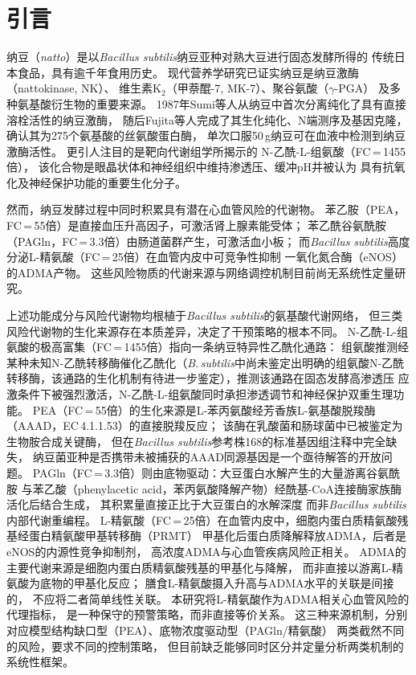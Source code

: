 \documentclass[10pt, a4paper, twocolumn]{ctexart}
\newcommand{\bs}{\textit{Bacillus subtilis}}
\newcommand{\NAH}{N-乙酰-L-组氨酸}
\begin{document}

\section{引言}

纳豆（\textit{natto}）是以\bs{}纳豆亚种对熟大豆进行固态发酵所得的
传统日本食品，具有逾千年食用历史。
现代营养学研究已证实纳豆是纳豆激酶（nattokinase, NK）、
维生素K$_2$（甲萘醌-7, MK-7）、聚谷氨酸（$\gamma$-PGA）
及多种氨基酸衍生物的重要来源\citep{Sumi1987,Fujita1993}。
1987年Sumi等人从纳豆中首次分离纯化了具有直接溶栓活性的纳豆激酶，
随后Fujita等人完成了其生化纯化、N端测序及基因克隆，
确认其为275个氨基酸的丝氨酸蛋白酶，
单次口服50\,g纳豆可在血液中检测到纳豆激酶活性\citep{Sumi1987,Fujita1993}。
更引人注目的是靶向代谢组学所揭示的
\NAH{}（FC\,=\,1455倍），
该化合物是眼晶状体和神经组织中维持渗透压、缓冲pH并被认为
具有抗氧化及神经保护功能的重要生化分子\citep{Baslow2015}。

然而，纳豆发酵过程中同时积累具有潜在心血管风险的代谢物。
苯乙胺（PEA，FC\,=\,55倍）是直接血压升高因子，可激活肾上腺素能受体；
苯乙酰谷氨酰胺（PAGln，FC\,=\,3.3倍）由肠道菌群产生，可激活血小板；
而\bs{}高度分泌L-精氨酸（FC\,=\,25倍）在血管内皮中可竞争性抑制
一氧化氮合酶（eNOS）的ADMA产物\citep{EFSA2011,Ladero2010}。
这些风险物质的代谢来源与网络调控机制目前尚无系统性定量研究。

上述功能成分与风险代谢物均根植于\bs{}的氨基酸代谢网络，
但三类风险代谢物的生化来源存在本质差异，决定了干预策略的根本不同。
\NAH{}的极高富集（FC\,=\,1455倍）指向一条纳豆特异性乙酰化通路：
组氨酸推测经某种未知N-乙酰转移酶催化乙酰化（\textit{B.\,subtilis}中尚未鉴定出明确的组氨酸N-乙酰转移酶，该通路的生化机制有待进一步鉴定），推测该通路在固态发酵高渗透压
应激条件下被强烈激活，\NAH{}同时承担渗透调节和神经保护双重生理功能\citep{Baslow2015}。
PEA（FC\,=\,55倍）的生化来源是L-苯丙氨酸经芳香族L-氨基酸脱羧酶
（AAAD，EC\,4.1.1.53）的直接脱羧反应；
该酶在乳酸菌和肠球菌中已被鉴定为生物胺合成关键酶，
但在\bs{}参考株168的标准基因组注释中完全缺失\citep{Ladero2010}，
纳豆菌亚种是否携带未被捕获的AAAD同源基因是一个亟待解答的开放问题。
PAGln（FC\,=\,3.3倍）则由底物驱动：大豆蛋白水解产生的大量游离谷氨酰胺
与苯乙酸（phenylacetic acid，苯丙氨酸降解产物）经酰基-CoA连接酶家族酶活化后结合生成，
其积累量直接正比于大豆蛋白的水解深度
而非\bs{}内部代谢重编程\citep{EFSA2011}。
L-精氨酸（FC\,=\,25倍）在血管内皮中，细胞内蛋白质精氨酸残基经蛋白精氨酸甲基转移酶（PRMT）
甲基化后蛋白质降解释放ADMA，后者是eNOS的内源性竞争抑制剂，
高浓度ADMA与心血管疾病风险正相关\citep{EFSA2011}。
ADMA的主要代谢来源是细胞内蛋白质精氨酸残基的甲基化与降解，
而非直接以游离L-精氨酸为底物的甲基化反应；
膳食L-精氨酸摄入升高与ADMA水平的关联是间接的，
不应将二者简单线性关联。
本研究将L-精氨酸作为ADMA相关心血管风险的代理指标，
是一种保守的预警策略，而非直接等价关系。
这三种来源机制，分别对应模型结构缺口型（PEA）、底物浓度驱动型（PAGln/精氨酸）
两类截然不同的风险，要求不同的控制策略，
但目前缺乏能够同时区分并定量分析两类机制的系统性框架。
\end{document}
